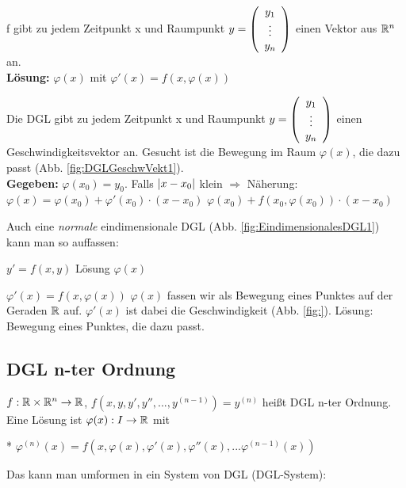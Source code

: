 f gibt zu jedem Zeitpunkt x und Raumpunkt $y=  \left(  \begin{array}{c} y_1\\\vdots\\y_n \end{array}  \right)  $ einen Vektor aus $\mathbb{R}^n$ an. \\

\textbf{Lösung:} $\varphi(x)$ mit $\varphi'(x) = f(x,\varphi(x))$

Die DGL gibt zu jedem Zeitpunkt x und Raumpunkt $y=  \left(  \begin{array}{c} y_1\\\vdots\\y_n \end{array}  \right)  $ einen Geschwindigkeitsvektor an. Gesucht ist die Bewegung im Raum $\varphi(x)$, die dazu passt (Abb. \ref{fig:DGLGeschwVekt1}).\\

\textbf{Gegeben:} $\varphi(x_0) = y_0$. Falls $ \left\vert x-x_0 \right\vert $ klein 
$\Rightarrow$ Näherung: $\varphi(x) = \varphi(x_0) + \varphi'(x_0) \cdot (x-x_0)$
$\varphi(x_0) + f(x_0, \varphi(x_0)) \cdot (x-x_0)$

Auch eine \textit{normale} eindimensionale DGL (Abb. \ref{fig:EindimensionalesDGL1}) kann man so auffassen: 

$y' = f(x,y)$ Lösung $\varphi(x)$

$\varphi'(x) = f(x,\varphi(x))$
$\varphi(x)$ fassen wir als Bewegung eines Punktes auf der Geraden $\mathbb{R}$ auf. $\varphi'(x)$ ist dabei die Geschwindigkeit (Abb. \ref{fig:}). Lösung: Bewegung eines Punktes, die dazu passt. 

\subsection{DGL n-ter Ordnung}

\begin{defi}
$ f: \mathbb{R} \times \mathbb{R}^n \rightarrow \mathbb{R}$,
$f(x,y,y',y'',...,y^{(n-1)}) = y^{(n)}$ heißt DGL n-ter Ordnung. Eine Lösung ist $\varphi(x) : I \rightarrow \mathbb{R}$ mit 

* \label{*} $ \varphi^{(n)}(x) = f(x,\varphi(x),\varphi'(x),\varphi''(x),...\varphi^{(n-1)}(x))$
\end{defi}

Das kann man umformen in ein System von DGL (DGL-System):

